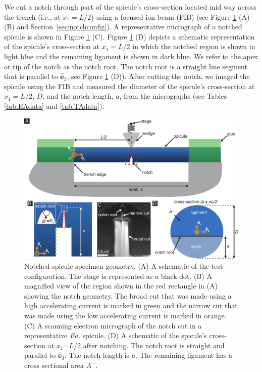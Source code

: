 \documentclass[12pt,onecolumn]{article}
\makeatletter
\newcommand{\ez}{{\bm{\hat{e}}}_3}
\newcommand{\EA}{\textit{Ea.\@}\xspace}
\makeatother
\begin{document}
\begin{bibunit}
We cut a notch through part of the spicule's cross-section located mid way across the trench (i.e., at $x_1=L/2$) using a focused ion beam (FIB) (see Figure \ref{fig:notch} (A)--(B) and Section~\ref{sec:notchconfig}). A representative micrograph of a notched spicule is shown in Figure \ref{fig:notch} (C). Figure \ref{fig:notch} (D) depicts a schematic representation of the spicule's cross-section at $x_1=L/2$ in which the notched region is shown in light blue and the remaining ligament is shown in dark blue. We refer to the apex or tip of the notch as the notch root. The notch root is a straight line segment that is parallel to $\ez$, see Figure \ref{fig:notch} (D)). After cutting the notch, we imaged the spicule using the FIB and measured the diameter of the spicule's cross-section at $x_1=L/2$, $D$, and the notch length, $a$, from the micrographs (see Tables \ref{tab:EAdata} and \ref{tab:TAdata}). 
%
			\begin{figure}[hb!]
			\centering
			\includegraphics[width=\textwidth]{../Figures/FigureNotch/Figure3_V6.pdf}
			\caption{Notched spicule specimen geometry. (A) A schematic of the test configuration. The stage is represented as a black dot. (B) A magnified view of the region shown in the red rectangle in (A) showing the notch geometry. The broad cut that was made using a high accelerating current is marked in green and the narrow cut that was made using the low accelerating current is marked in orange. (C) A scanning electron micrograph of the notch cut in a representative \EA spicule. (D) A schematic of the spicule's cross-section at $x_1$=$L$/2 after notching. The notch root is straight and parallel to $\ez$. The notch length is $a$. The remaining ligament has a cross sectional area $A^-$.}
			\label{fig:notch}
			\end{figure}


\end{bibunit}
\end{document}
